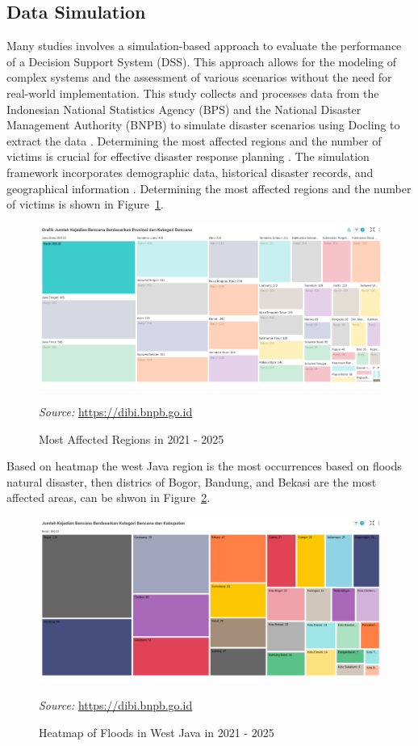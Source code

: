 \documentclass[conference,final,a4paper,twoside,10pt]{IEEEtran}
\begin{document}
\subsection{Data Simulation}

Many studies involves a simulation-based approach to evaluate the performance of a Decision Support System (DSS)\cite{he2020dynamic}. This approach allows for the modeling of complex systems and the assessment of various scenarios without the need for real-world implementation\cite{latchmore2023integrating}. This study collects and processes data from the Indonesian National Statistics Agency (BPS) and the National Disaster Management Authority (BNPB) to simulate disaster scenarios using Docling to extract the data \cite{Docling}. Determining the most affected regions and the number of victims is crucial for effective disaster response planning \cite{endo2020estimating}. The simulation framework incorporates demographic data, historical disaster records, and geographical information \cite{santos2020workforce}. Determining the most affected regions and the number of victims is shown in Figure~\ref{fig:simulationframework}. 
\begin{figure}[htbp]
    \centerline{\includegraphics[width=0.8\linewidth]{fig4.png}
    }
    \caption{Most Affected Regions in 2021 - 2025}
    \label{fig:simulationframework}
    \footnotesize{\textit{Source:} \url{https://dibi.bnpb.go.id}}
\end{figure}
Based on heatmap the west Java region is the most occurrences based on floods natural disaster, then districs of Bogor, Bandung, and Bekasi are the most affected areas, can be shwon in Figure~\ref{fig:heatmap2}. 
\begin{figure}[htbp]
    \centerline{\includegraphics[width=0.8\linewidth]{fig5.png}}
    \caption{Heatmap of Floods in West Java in 2021 - 2025}
    \label{fig:heatmap2}
    \footnotesize{\textit{Source:} \url{https://dibi.bnpb.go.id}}
\end{figure} 
\end{document}

